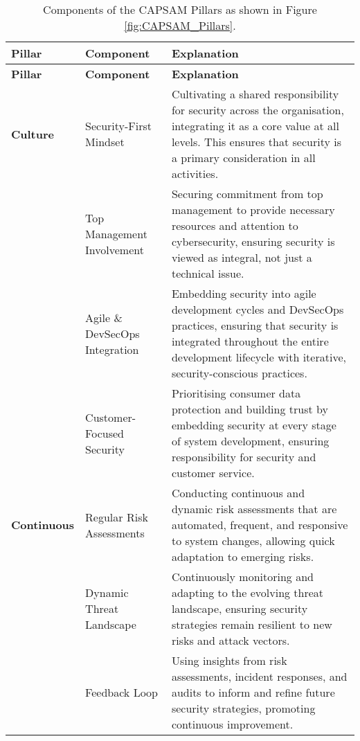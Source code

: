 \renewcommand{\arraystretch}{1.3}
\begin{longtable}{|>{\raggedright}m{2.5cm}|>{\raggedright}m{3.5cm}|>{\raggedright\arraybackslash}m{8cm}|}
    \caption{Components of the CAPSAM Pillars as shown in Figure \ref{fig:CAPSAM_Pillars}.}
    \label{tab:CAPSAM_Pillars_Components} \\
    \hline
    \textbf{Pillar} & \textbf{Component} & \textbf{Explanation} \\ \hline\hline
    \endfirsthead
    \hline
    \textbf{Pillar} & \textbf{Component} & \textbf{Explanation} \\ \hline
    \endhead
    \hline
    \endfoot
    \hline
    \endlastfoot

    \textbf{Culture} & Security-First Mindset & Cultivating a shared responsibility for security across the organisation, integrating it as a core value at all levels. This ensures that security is a primary consideration in all activities. \\
    \cline{2-3}
    & Top Management Involvement & Securing commitment from top management to provide necessary resources and attention to cybersecurity, ensuring security is viewed as integral, not just a technical issue. \\
    \cline{2-3}
    & Agile \& DevSecOps Integration & Embedding security into agile development cycles and DevSecOps practices, ensuring that security is integrated throughout the entire development lifecycle with iterative, security-conscious practices. \\
    \cline{2-3}
    & Customer-Focused Security & Prioritising consumer data protection and building trust by embedding security at every stage of system development, ensuring responsibility for security and customer service. \\
    \hline\hline

    \textbf{Continuous} & Regular Risk Assessments & Conducting continuous and dynamic risk assessments that are automated, frequent, and responsive to system changes, allowing quick adaptation to emerging risks. \\
    \cline{2-3}
    & Dynamic Threat Landscape & Continuously monitoring and adapting to the evolving threat landscape, ensuring security strategies remain resilient to new risks and attack vectors. \\
    \cline{2-3}
    & Feedback Loop & Using insights from risk assessments, incident responses, and audits to inform and refine future security strategies, promoting continuous improvement. \\
    \hline\hline


\end{longtable}
